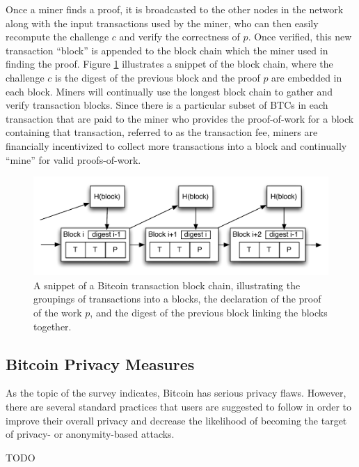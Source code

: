 Once a miner finds a proof, it is broadcasted to the other nodes in the network along with the input transactions used by the miner, who can then easily recompute the challenge $c$ and verify the correctness of $p$. Once verified, this new transaction ``block'' is appended to the block chain which the miner used in finding the proof. Figure \ref{fig:block} illustrates a snippet of the block chain, where the challenge $c$ is the digest of the previous block and the proof $p$ are embedded in each block. Miners will continually use the longest block chain to gather and verify transaction blocks. Since there is a particular subset of BTCs in each transaction that are paid to the miner who provides the proof-of-work for a block containing that transaction, referred to as the transaction fee, miners are financially incentivized to collect more transactions into a block and continually ``mine'' for valid proofs-of-work. 

\begin{center}
\begin{figure}
\includegraphics[scale=0.5]{./images/transaction_block_pow.pdf}
\caption{A snippet of a Bitcoin transaction block chain, illustrating the groupings of transactions into a blocks, the declaration of the proof of the work $p$, and the digest of the previous block linking the blocks together.}
\label{fig:block}
\end{figure}
\end{center}

\subsection{Bitcoin Privacy Measures}
As the topic of the survey indicates, Bitcoin has serious privacy flaws. However, there are several standard practices that users are suggested to follow in order to improve their overall privacy and decrease the likelihood of becoming the target of privacy- or anonymity-based attacks. 

TODO

